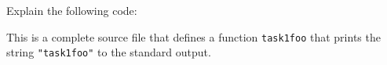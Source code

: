 Explain the following code:


\begin{solution}
    This is a complete source file that defines a function \lstinline{task1foo}
    that prints the string \lstinline{"task1foo"} to the standard output.
\end{solution}
